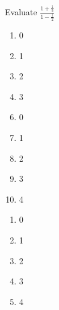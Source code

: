 

   Evaluate $\frac{1+\frac{1}{2}   }{1-\frac{1}{2} }$


\ifsat
	\begin{enumerate}[label=\Alph*)]
		\item   0
		\item  1
		\item  2
		\item  3 %
	\end{enumerate}
\else
\fi

\ifacteven
	\begin{enumerate}[label=\textbf{\Alph*.},itemsep=\fill,align=left]
		\setcounter{enumii}{5}
		\item   0
		\item  1
		\item  2
		\addtocounter{enumii}{1}
		\item  3 %
		\item  4
	\end{enumerate}
\else
\fi

\ifactodd
	\begin{enumerate}[label=\textbf{\Alph*.},itemsep=\fill,align=left]
		\item   0
		\item  1
		\item  2
		\item  3 %
		\item  4
	\end{enumerate}
\else
\fi


\else
\fi

